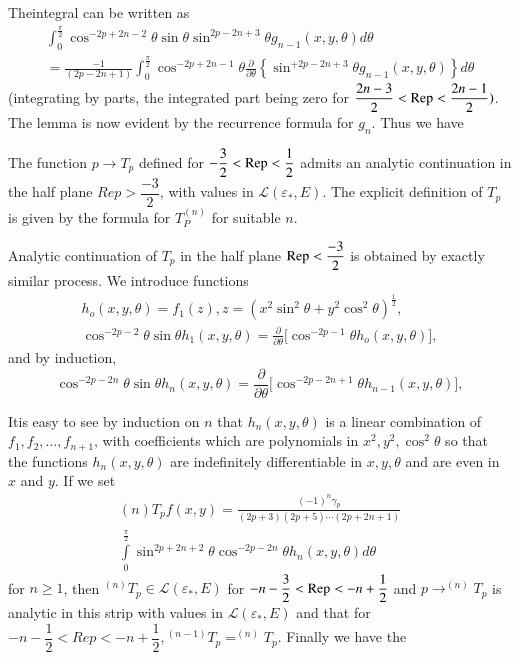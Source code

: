 The\pageoriginale integral can be written as
\begin{multline*}
  \int^{\frac{\pi}{2}}_0 \cos^{-2 p + 2n - 2} \theta \sin \theta
  \sin^{2p - 2n + 3} \theta g_{n - 1} (x, y, \theta) d \theta\\ 
  = \frac{-1}{(2 p - 2n + 1)} \int^{\frac{\pi}{2}}_0 \cos^{-2p +
    2n-1} \theta \frac{\partial}{\partial \theta} \left\{\sin^{+ 2 p
    - 2n + 3} \theta g_{n - 1} (x, y, \theta)\right\} d \theta 
\end{multline*}
(integrating by parts, the integrated part being zero for $\dfrac{2n -
  3}{2} < \operatorname{Rep}< \dfrac{2n - 1}{2})$. The lemma is now evident by the
recurrence formula for $g_n$. Thus we have   

\begin{prop*}
  The function $p \to T_p$ defined for $- \dfrac{3}{2} < \operatorname{Rep}<
  \dfrac{1}{2}$ admits an analytic continuation in the half plane $Rep
  > \dfrac{-3}{2}$, with values in $\mathscr{L} (\varepsilon_*,
  E)$. The explicit definition of $T_p$ is given by the formula for
  $T^{(n)}_P$ for suitable $n$. 
\end{prop*}

Analytic continuation of $T_p$ in the half plane $\operatorname{Rep}<
\dfrac{-3}{2}$ is obtained by exactly similar process. We introduce
functions 
\begin{gather*}
  h_o (x, y, \theta) = f_1 (z), z =  (x^2 \sin^2 \theta + y^2 \cos^2
  \theta)^{\frac{1}{2}},\\ 
  \cos^{-2p-2} \theta \sin \theta h_1 (x, y, \theta) =
  \frac{\partial}{\partial \theta} \bigg[\cos^{-2 p -1} \theta h_o (x,
    y, \theta)\bigg],
\end{gather*}
and by induction,
$$
\cos^{-2 p - 2n} \theta \sin \theta h_n (x, y, \theta) =
\frac{\partial}{\partial \theta} \bigg[\cos^{-2 p - 2n + 1} \theta
  h_{n - 1} (x, y, \theta)\bigg], 
$$

It\pageoriginale is easy to see by induction on $n$ that $h_n (x, y, \theta)$ is a
linear combination of $f_1, f_2, \ldots, f_{n + 1}$, with coefficients
which are polynomials in $x^2, y^2, \cos^2 \theta$ so that the
functions $h_n (x, y, \theta)$ are indefinitely differentiable in $x,
y, \theta$ and are even in $x$ and $y$. If we set 
\begin{multline*}
  (n) T_p f (x, y)  = \frac{(-1)^n \gamma_p}{(2p + 3)(2p + 5) \cdots (2p
    + 2n + 1)}\\ 
  \int\limits_0^{\frac{\pi}{2}} \sin^{2p + 2n + 2} \theta \cos^{-2 p
    -2n} \theta h_n (x, y, \theta) d \theta 
\end{multline*}
for $n \ge 1$, then ${}^{(n)}T_p \in \mathscr{L} (\varepsilon_*, E)$ for $-
n - \dfrac{3}{2} < \operatorname{Rep} < -  n + \dfrac{1}{2}$ and $p \to
^{(n)}T_p$ is analytic in this strip with values in
$\mathscr{L}(\varepsilon_*, E)$ and that for $- n - \dfrac{1}{2} < Rep
< - n + \dfrac{1}{2}, {}^{(n - 1)}T_p =^{(n)}T_p$. Finally we have the 

